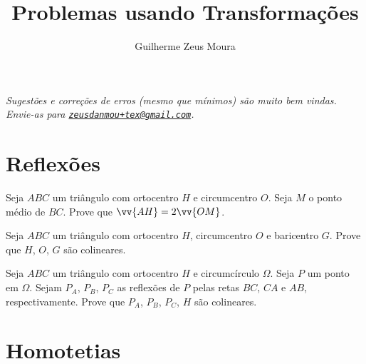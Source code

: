\documentclass[10pt, a4paper]{article}
\title{Problemas usando Transformações}
\author{Guilherme Zeus Moura}
\begin{document}
	
	\zeustitle
	

	\begin{center}
		\begin{minipage}{12cm}
		\slshape Sugestões e correções de erros (mesmo que mínimos) são muito bem vindas. Envie-as para \href{mailto:zeusdanmou+tex@gmail.com}{\texttt{zeusdanmou+tex@gmail.com}}.
		\end{minipage}
	\end{center}

	\vspace{.3cm}

	\begin{center}
		\begin{minipage}{12cm}	
			\tableofcontents
		\end{minipage}
	\end{center}

	\vspace{.5cm}

	\section{Reflexões}

	\begin{prob}
		Seja $ABC$ um triângulo com ortocentro $H$ e circumcentro $O$. Seja $M$ o ponto médio de $BC$. Prove que $\vv{AH} = 2\vv{OM}$.
	\end{prob}

	\begin{prob}
		Seja $ABC$ um triângulo com ortocentro $H$, circumcentro $O$ e baricentro $G$. Prove que $H$, $O$, $G$ são colineares.
	\end{prob}

	\begin{prob}
		Seja $ABC$ um triângulo com ortocentro $H$ e circumcírculo $\Omega$. Seja $P$ um ponto em $\Omega$. Sejam $P_A$, $P_B$, $P_C$ as reflexões de $P$ pelas retas $BC$, $CA$ e $AB$, respectivamente. Prove que $P_A$, $P_B$, $P_C$, $H$ são colineares.
	\end{prob}




	\section{Homotetias}
	
\end{document}
